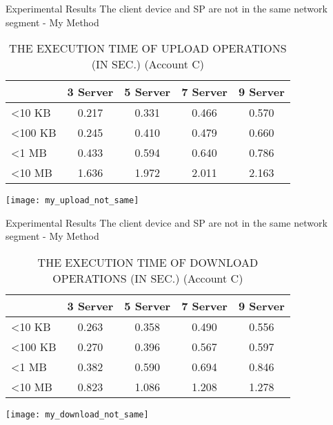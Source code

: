 \begin{frame}{Experimental Results}
{The client device and SP are \alert{not} in the same network segment - My Method}
	\scriptsize
    \begin{table}[]
    \centering
    \caption{THE EXECUTION TIME OF \alert{UPLOAD} OPERATIONS (IN SEC.) (Account C)}
    \begin{tabular}{lcccc}
                         & 3 Server & 5 Server & 7 Server & 9 Server \\ \hline
        \textless 10 KB  & 0.217 & 0.331 & 0.466 & 0.570 \\ \hline
        \textless 100 KB & 0.245 & 0.410 & 0.479 & 0.660 \\ \hline
        \textless 1 MB   & 0.433 & 0.594 & 0.640 & 0.786 \\ \hline
        \textless 10 MB  & 1.636 & 1.972 & 2.011 & 2.163 \\ \hline
    \end{tabular}
    \end{table}
    \begin{center}
		\texttt{[image: my\_upload\_not\_same]}
    \end{center}
\end{frame}

\begin{frame}{Experimental Results}
{The client device and SP are \alert{not} in the same network segment - My Method}
	\scriptsize
    \begin{table}[]
    \centering
    \caption{THE EXECUTION TIME OF \alert{DOWNLOAD} OPERATIONS (IN SEC.) (Account C)}
    \begin{tabular}{lcccc}
                         & 3 Server & 5 Server & 7 Server & 9 Server \\ \hline
        \textless 10 KB  & 0.263 & 0.358 & 0.490 & 0.556 \\ \hline
        \textless 100 KB & 0.270 & 0.396 & 0.567 & 0.597 \\ \hline
        \textless 1 MB   & 0.382 & 0.590 & 0.694 & 0.846 \\ \hline
        \textless 10 MB  & 0.823 & 1.086 & 1.208 & 1.278 \\ \hline
    \end{tabular}
    \end{table}
    \begin{center}
		\texttt{[image: my\_download\_not\_same]}
    \end{center}
\end{frame}

